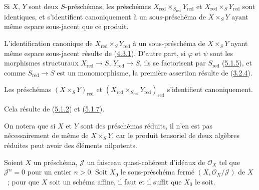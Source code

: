 \begin{proposition}[5.1.7]
\label{I.5.1.7-fr}
Si $X$, $Y$ sont deux $S$-préschémas, les préschémas
$X_{\mathrm{red}}\times_{S_{\mathrm{red}}}Y_{\mathrm{red}}$ et
$X_{\mathrm{red}}\times_S Y_{\mathrm{red}}$ sont identiques, et
s'identifient canoniquement à un sous-préschéma de $X\times_S Y$ ayant même
espace sous-jacent que ce produit.
\end{proposition}

L'identification canonique de $X_{\mathrm{red}}\times_S Y_{\mathrm{red}}$ à
un sous-préschéma de $X\times_S Y$ ayant même espace sous-jacent résulte de
(\hyperref[I.4.3.1-fr]{4.3.1}). D'autre part, si $\varphi$ et $\psi$ sont les
morphismes structuraux $X_{\mathrm{red}}\to S$, $Y_{\mathrm{red}}\to S$, ils
se factorisent par $S_{\mathrm{red}}$
(\hyperref[I.5.1.5-fr]{5.1.5}), et comme $S_{\mathrm{red}}\to S$ est un
monomorphisme, la première assertion résulte de
(\hyperref[I.3.2.4-fr]{3.2.4}).

\begin{corollary}[5.1.8]
\label{I.5.1.8-fr}
Les préschémas $(X\times_S Y)_{\mathrm{red}}$ et
$(X_{\mathrm{red}}\times_{S_{\mathrm{red}}}Y_{\mathrm{red}})_{\mathrm{red}}$
s'identifient canoniquement.
\end{corollary}

Cela résulte de (\hyperref[I.5.1.2-fr]{5.1.2}) et
(\hyperref[I.5.1.7-fr]{5.1.7}).

On notera que si $X$ et $Y$ sont des préschémas réduits, il n'en est pas
nécessairement de même de $X\times_S Y$, car le produit tensoriel de deux
algèbres réduites peut avoir des éléments nilpotents.

\begin{proposition}[5.1.9]
\label{I.5.1.9-fr}
Soient $X$ un préschéma, $\mathscr{J}$ un faisceau quasi-cohérent d'idéaux de
$\mathscr{O}_X$ tel que $\mathscr{J}^n=0$ pour un entier $n>0$. Soit $X_0$ le
sous-préschéma fermé $(X,\mathscr{O}_X/\mathscr{J})$ de $X$~; pour que $X$
soit un schéma affine, il faut et il suffit que $X_0$ le soit.
\end{proposition}

